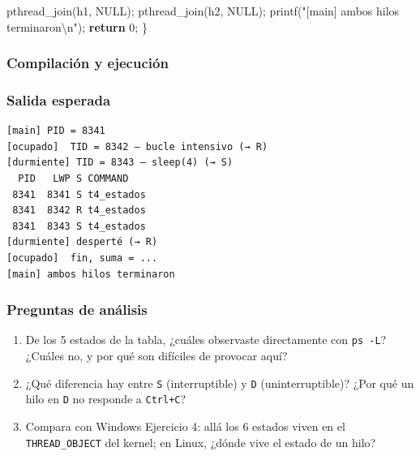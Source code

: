 \documentclass[
  spanish,
]{article}
\newenvironment{Shaded}{}{}
\newcommand{\AttributeTok}[1]{\textcolor[rgb]{0.49,0.56,0.16}{#1}}
\newcommand{\CommentTok}[1]{\textcolor[rgb]{0.38,0.63,0.69}{\textit{#1}}}
\newcommand{\ControlFlowTok}[1]{\textcolor[rgb]{0.00,0.44,0.13}{\textbf{#1}}}
\newcommand{\DecValTok}[1]{\textcolor[rgb]{0.25,0.63,0.44}{#1}}
\newcommand{\ExtensionTok}[1]{#1}
\newcommand{\FunctionTok}[1]{\textcolor[rgb]{0.02,0.16,0.49}{#1}}
\newcommand{\KeywordTok}[1]{\textcolor[rgb]{0.00,0.44,0.13}{\textbf{#1}}}
\newcommand{\NormalTok}[1]{#1}
\newcommand{\OperatorTok}[1]{\textcolor[rgb]{0.40,0.40,0.40}{#1}}
\newcommand{\SpecialCharTok}[1]{\textcolor[rgb]{0.25,0.44,0.63}{#1}}
\newcommand{\StringTok}[1]{\textcolor[rgb]{0.25,0.44,0.63}{#1}}
\newcommand{\VariableTok}[1]{\textcolor[rgb]{0.10,0.09,0.49}{#1}}
\providecommand{\tightlist}{%
  \setlength{\itemsep}{0pt}\setlength{\parskip}{0pt}}
\begin{document}
\begin{Shaded}
\begin{Highlighting}[]
\NormalTok{    pthread\_join}\OperatorTok{(}\NormalTok{h1}\OperatorTok{,}\NormalTok{ NULL}\OperatorTok{);}
\NormalTok{    pthread\_join}\OperatorTok{(}\NormalTok{h2}\OperatorTok{,}\NormalTok{ NULL}\OperatorTok{);}
\NormalTok{    printf}\OperatorTok{(}\StringTok{"[main] ambos hilos terminaron}\SpecialCharTok{\textbackslash{}n}\StringTok{"}\OperatorTok{);}
    \ControlFlowTok{return} \DecValTok{0}\OperatorTok{;}
\OperatorTok{\}}
\end{Highlighting}
\end{Shaded}

\subsubsection{Compilación y
ejecución}\label{compilaciuxf3n-y-ejecuciuxf3n-3}

\begin{Shaded}
\end{Shaded}

\subsubsection{Salida esperada}\label{salida-esperada-3}

\begin{verbatim}
[main] PID = 8341
[ocupado]  TID = 8342 — bucle intensivo (→ R)
[durmiente] TID = 8343 — sleep(4) (→ S)
  PID   LWP S COMMAND
 8341  8341 S t4_estados
 8341  8342 R t4_estados
 8341  8343 S t4_estados
[durmiente] desperté (→ R)
[ocupado]  fin, suma = ...
[main] ambos hilos terminaron
\end{verbatim}

\subsubsection{Preguntas de análisis}\label{preguntas-de-anuxe1lisis-3}

\begin{enumerate}
\def\labelenumi{\arabic{enumi}.}
\tightlist
\item
  De los 5 estados de la tabla, ¿cuáles observaste directamente con
  \texttt{ps\ -L}? ¿Cuáles no, y por qué son difíciles de provocar aquí?
\item
  ¿Qué diferencia hay entre \texttt{S} (interruptible) y \texttt{D}
  (uninterruptible)? ¿Por qué un hilo en \texttt{D} no responde a
  \texttt{Ctrl+C}?
\item
  Compara con Windows Ejercicio 4: allá los 6 estados viven en el
  \texttt{THREAD\_OBJECT} del kernel; en Linux, ¿dónde vive el estado de
  un hilo?
\end{enumerate}
\end{document}
